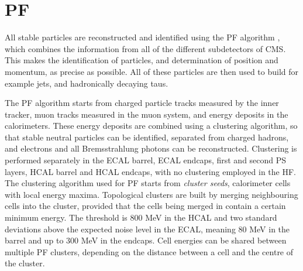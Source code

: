 \section{\acl{PF}}
\label{sec:objects_pf}
All stable particles are reconstructed and identified using the \ac{PF} algorithm \cite{cms-pf-2009,cms-pf-2010-commfirst,cms-pf-2010-2}, which
combines the information from all of the different subdetectors of \ac{CMS}. This makes
the identification of particles, and determination of position and momentum, as precise
as possible. All of these particles are then used to build for example jets, \MET and hadronically
decaying taus.

The \ac{PF} algorithm starts from charged particle tracks measured
by the inner tracker, muon tracks measured in the muon system, and 
energy deposits in the calorimeters. These energy deposits are combined
using a clustering algorithm, so that stable neutral particles can be identified,
separated from charged hadrons, and electrons and all Bremsstrahlung photons
can be reconstructed. Clustering is performed separately in the \ac{ECAL} barrel,
\ac{ECAL} endcaps, first and second \ac{PS} layers, \ac{HCAL} barrel and \ac{HCAL} endcaps, with no 
clustering employed in the \ac{HF}.
The clustering algorithm used for \ac{PF} starts from \textit{cluster seeds},
calorimeter cells with local energy maxima. Topological clusters are built by 
merging neighbouring cells into the cluster, provided that the cells
being merged in contain a certain minimum energy.
The threshold is 800 MeV in the \ac{HCAL} and two standard deviations above the
expected noise level in the \ac{ECAL}, meaning 80 MeV in the barrel and up 
to 300 MeV in the endcaps. Cell energies can be shared between multiple
\ac{PF} clusters, depending on the distance between a cell and the centre of the cluster.


